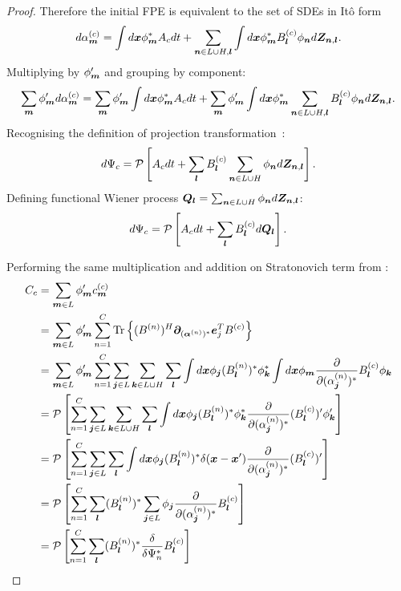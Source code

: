 \begin{proof}
Therefore the initial FPE is equivalent to the set of SDEs in It\^{o} form
\[
	d\alpha_{\boldsymbol{m}}^{(c)}
	= \int d\boldsymbol{x} \phi_{\boldsymbol{m}}^* A_c dt
	+ \sum_{\boldsymbol{n} \in L \cup H, \boldsymbol{l}}
		\int d\boldsymbol{x} \phi_{\boldsymbol{m}}^* B_{\boldsymbol{l}}^{(c)} \phi_{\boldsymbol{n}} d\bm{Z}_{\boldsymbol{n},\boldsymbol{l}}.
\]
Multiplying by $\phi_{\boldsymbol{m}}^\prime$ and grouping by component:
\[
	\sum_{\boldsymbol{m}} \phi_{\boldsymbol{m}}^\prime d\alpha_{\boldsymbol{m}}^{(c)}
	= \sum_{\boldsymbol{m}} \phi_{\boldsymbol{m}}^\prime \int d\boldsymbol{x} \phi_{\boldsymbol{m}}^* A_c dt
	+ \sum_{\boldsymbol{m}} \phi_{\boldsymbol{m}}^\prime \int d\boldsymbol{x} \phi_{\boldsymbol{m}}^*
		\sum_{\boldsymbol{n} \in L \cup H, \boldsymbol{l}} B_{\boldsymbol{l}}^{(c)} \phi_{\boldsymbol{n}} d\bm{Z}_{\boldsymbol{n},\boldsymbol{l}}.
\]
Recognising the definition of projection transformation~:
\[
	d\Psi_c
	= \mathcal{P} \left[
		A_c dt
		+ \sum_{\boldsymbol{l}} B_{\boldsymbol{l}}^{(c)}
			\sum_{\boldsymbol{n} \in L \cup H} \phi_{\boldsymbol{n}} d\bm{Z}_{\boldsymbol{n},\boldsymbol{l}}
	\right].
\]
Defining functional Wiener process $\bm{Q}_{\boldsymbol{l}} = \sum_{\boldsymbol{n} \in L \cup H} \phi_{\boldsymbol{n}} d\bm{Z}_{\boldsymbol{n},\boldsymbol{l}}$:
\[
	d\Psi_c
	= \mathcal{P} \left[
		A_c dt
		+ \sum_{\boldsymbol{l}} B_{\boldsymbol{l}}^{(c)} d\bm{Q}_{\boldsymbol{l}}
	\right].
\]

Performing the same multiplication and addition on Stratonovich term from :
\begin{equation*}
\begin{split}
	C_c
	& = \sum_{\boldsymbol{m} \in L} \phi_{\boldsymbol{m}}^\prime c_{\boldsymbol{m}}^{(c)} \\
	& = \sum_{\boldsymbol{m} \in L} \phi_{\boldsymbol{m}}^\prime \sum_{n=1}^C \mathrm{Tr} \left\{ 
		(B^{(n)})^H \bm{\partial}_{(\bm{\alpha}^{(n)})^*} \bm{e}_j^T B^{(c)}
	 \right\} \\
	& = \sum_{\boldsymbol{m} \in L} \phi_{\boldsymbol{m}}^\prime \sum_{n=1}^C
		\sum_{\boldsymbol{j} \in L} \sum_{\boldsymbol{k} \in L \cup H} \sum_{\boldsymbol{l}}
		\int d\boldsymbol{x} \phi_{\boldsymbol{j}} (B_{\boldsymbol{l}}^{(n)})^* \phi_{\boldsymbol{k}}^*
		\int d\boldsymbol{x} \phi_{\boldsymbol{m}}
			\frac{\partial}{\partial (\alpha_{\boldsymbol{j}}^{(n)})^*} B_{\boldsymbol{l}}^{(c)} \phi_{\boldsymbol{k}} \\
	& = \mathcal{P} \left[
		\sum_{n=1}^C
		\sum_{\boldsymbol{j} \in L} \sum_{\boldsymbol{k} \in L \cup H} \sum_{\boldsymbol{l}}
		\int d\boldsymbol{x} \phi_{\boldsymbol{j}} (B_{\boldsymbol{l}}^{(n)})^* \phi_{\boldsymbol{k}}^*
		\frac{\partial}{\partial (\alpha_{\boldsymbol{j}}^{(n)})^*} (B_{\boldsymbol{l}}^{(c)})^\prime \phi_{\boldsymbol{k}}^\prime
	\right] \\
	& = \mathcal{P} \left[
		\sum_{n=1}^C
		\sum_{\boldsymbol{j} \in L} \sum_{\boldsymbol{l}}
		\int d\boldsymbol{x} \phi_{\boldsymbol{j}} (B_{\boldsymbol{l}}^{(n)})^* \delta(\boldsymbol{x} - \boldsymbol{x}^\prime)
		\frac{\partial}{\partial (\alpha_{\boldsymbol{j}}^{(n)})^*} (B_{\boldsymbol{l}}^{(c)})^\prime
	\right] \\
	& = \mathcal{P} \left[
		\sum_{n=1}^C \sum_{\boldsymbol{l}}
		(B_{\boldsymbol{l}}^{(n)})^*
		\sum_{\boldsymbol{j} \in L}
		\phi_{\boldsymbol{j}} \frac{\partial}{\partial (\alpha_{\boldsymbol{j}}^{(n)})^*} B_{\boldsymbol{l}}^{(c)}
	\right] \\
	& = \mathcal{P} \left[
		\sum_{n=1}^C \sum_{\boldsymbol{l}}
		(B_{\boldsymbol{l}}^{(n)})^*
		\frac{\delta}{\delta \Psi_n^*}
		B_{\boldsymbol{l}}^{(c)}
	\right]
\end{split}
\end{equation*}
\end{proof}

